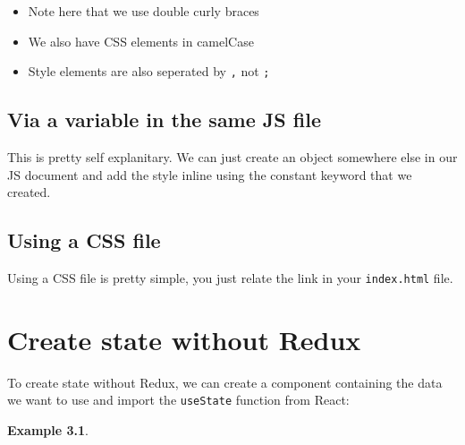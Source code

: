 \documentclass[
]{report}
\providecommand{\tightlist}{%
  \setlength{\itemsep}{0pt}\setlength{\parskip}{0pt}}
\theoremstyle{definition}
\theoremstyle{definition}
\newtheorem{example}{Example}[chapter]
\theoremstyle{definition}
\theoremstyle{definition}
\theoremstyle{remark}
\begin{document}
\begin{itemize}
\tightlist
\item
  Note here that we use double curly braces
\item
  We also have CSS elements in camelCase
\item
  Style elements are also seperated by \texttt{,} not \texttt{;}
\end{itemize}

\hypertarget{via-a-variable-in-the-same-js-file}{%
\section{Via a variable in the same JS file}\label{via-a-variable-in-the-same-js-file}}

This is pretty self explanitary. We can just create an object somewhere else in our JS document and add the style inline using the constant keyword that we created.

\hypertarget{using-a-css-file}{%
\section{Using a CSS file}\label{using-a-css-file}}

Using a CSS file is pretty simple, you just relate the link in your \texttt{index.html} file.

\hypertarget{create-state-without-redux}{%
\chapter{Create state without Redux}\label{create-state-without-redux}}

To create state without Redux, we can create a component containing the data we
want to use and import the \texttt{useState} function from React:

\begin{example}
\protect\hypertarget{exm:setting-state}{}{\label{exm:setting-state} }
\end{example}
\end{document}
